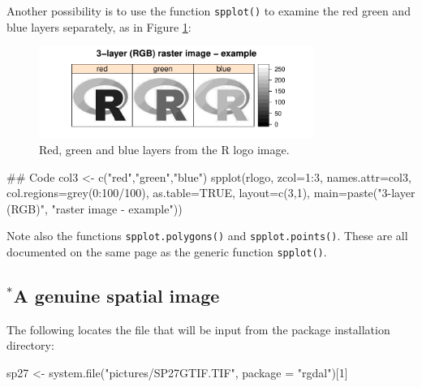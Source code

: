 \documentclass{tufte-book}\usepackage[]{graphicx}\usepackage[]{color}
\newcommand{\txtt}[1]{\texttt{#1}}
\begin{document}
Another possibility is to use the function \texttt{spplot()}
  to examine the red green and blue layers separately, as in Figure
  \ref{fig:rlogo3}:
\begin{figure}
\begin{Schunk}


\centerline{\includegraphics[width=0.8\textwidth]{figs/10-spplot-col3-1} }

\end{Schunk}
\caption{Red, green and blue layers from the R logo image.\label{fig:rlogo3}}
\end{figure}
\begin{Schunk}
\begin{Sinput}
## Code
col3 <- c("red","green","blue")
spplot(rlogo, zcol=1:3, names.attr=col3,
       col.regions=grey(0:100/100), as.table=TRUE,
       layout=c(3,1), main=paste("3-layer (RGB)",
       "raster image - example"))
\end{Sinput}
\end{Schunk}

  Note also the functions \txtt{spplot.polygons()} and
  \txtt{spplot.points()}.  These are all documented on the same page
  as the generic function \txtt{spplot()}.

\subsection*{$^*$A genuine spatial image}

The following locates the file that will be input
from the package installation directory:
\begin{Schunk}
\begin{Sinput}
sp27 <- system.file("pictures/SP27GTIF.TIF",
                    package = "rgdal")[1]
\end{Sinput}
\end{Schunk}
\end{document}
